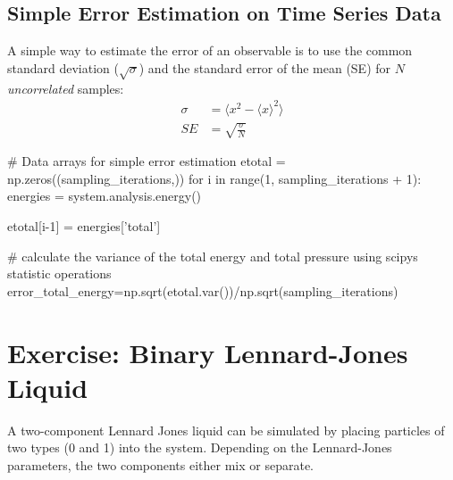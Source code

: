 \documentclass[
paper=a4,                       %
fontsize=11pt,                  %
twoside,                        %
footsepline,                    %
headsepline,                    %
headinclude=false,              %
footinclude=false,              %
pagesize,                       %
]{scrartcl}
\newtheorem{task}{Task}
\begin{document}
\vspace{1cm}\vspace{1cm}

\subsection{Simple Error Estimation on Time Series Data}
A simple way to estimate the error of an observable is to use the common standard
deviation ($\sqrt{\sigma}$) and the standard error of the mean (SE) for $N$
\emph{uncorrelated} samples:
\begin{align}
    \sigma  &= \langle x^2 - \langle x\rangle^2 \rangle \\
    SE      &= \sqrt{\frac{\sigma}{N}}
    \label{eq:variance}
\end{align}

\begin{pypresso}
# Data arrays for simple error estimation
etotal = np.zeros((sampling_iterations,))
for i in range(1, sampling_iterations + 1):
    energies = system.analysis.energy()

    etotal[i-1] = energies['total']

# calculate the variance of the total energy and total pressure using scipys statistic operations
error_total_energy=np.sqrt(etotal.var())/np.sqrt(sampling_iterations)
\end{pypresso}

\newpage
\section{Exercise: Binary Lennard-Jones Liquid}

%
A two-component Lennard Jones liquid can be simulated by placing particles of two types (0 and 1) into the system. 
Depending on the Lennard-Jones parameters, the two components either mix or separate.
\end{document}

